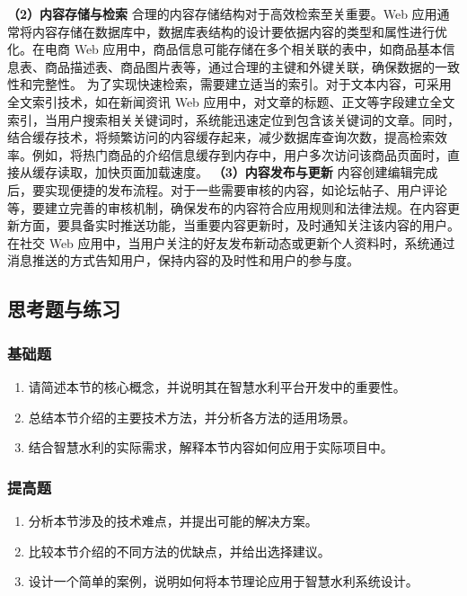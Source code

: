 \textbf{（2）内容存储与检索} 合理的内容存储结构对于高效检索至关重要。Web 应用通常将内容存储在数据库中，数据库表结构的设计要依据内容的类型和属性进行优化。在电商 Web
应用中，商品信息可能存储在多个相关联的表中，如商品基本信息表、商品描述表、商品图片表等，通过合理的主键和外键关联，确保数据的一致性和完整性。 为了实现快速检索，需要建立适当的索引。对于文本内容，可采用全文索引技术，如在新闻资讯 Web
应用中，对文章的标题、正文等字段建立全文索引，当用户搜索相关关键词时，系统能迅速定位到包含该关键词的文章。同时，结合缓存技术，将频繁访问的内容缓存起来，减少数据库查询次数，提高检索效率。例如，将热门商品的介绍信息缓存到内存中，用户多次访问该商品页面时，直接从缓存读取，加快页面加载速度。
\textbf{（3）内容发布与更新}
内容创建编辑完成后，要实现便捷的发布流程。对于一些需要审核的内容，如论坛帖子、用户评论等，要建立完善的审核机制，确保发布的内容符合应用规则和法律法规。在内容更新方面，要具备实时推送功能，当重要内容更新时，及时通知关注该内容的用户。在社交
Web 应用中，当用户关注的好友发布新动态或更新个人资料时，系统通过消息推送的方式告知用户，保持内容的及时性和用户的参与度。
\subsection{思考题与练习}\label{ux601dux8003ux9898ux4e0eux7ec3ux4e60-2} \subsubsection{基础题}\label{ux57faux7840ux9898-2}
\begin{enumerate} \def\labelenumi{\arabic{enumi}.} \tightlist \item 请简述本节的核心概念，并说明其在智慧水利平台开发中的重要性。 \item
总结本节介绍的主要技术方法，并分析各方法的适用场景。 \item 结合智慧水利的实际需求，解释本节内容如何应用于实际项目中。 \end{enumerate}
\subsubsection{提高题}\label{ux63d0ux9ad8ux9898-2} \begin{enumerate} \def\labelenumi{\arabic{enumi}.} \tightlist \item
分析本节涉及的技术难点，并提出可能的解决方案。 \item 比较本节介绍的不同方法的优缺点，并给出选择建议。 \item 设计一个简单的案例，说明如何将本节理论应用于智慧水利系统设计。 \end{enumerate}
